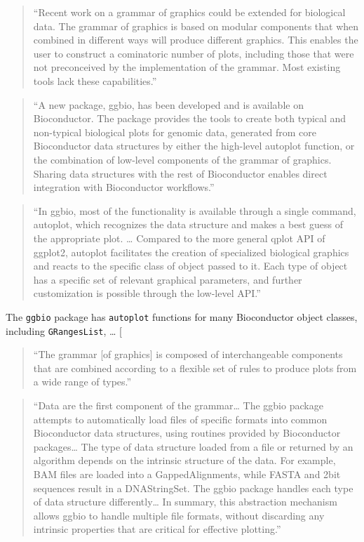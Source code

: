 \documentclass[]{tufte-book}
\begin{document}
\begin{quote}
``Recent work on a grammar of graphics could be extended for biological
data. The grammar of graphics is based on modular components that when
combined in different ways will produce different graphics. This enables
the user to construct a cominatoric number of plots, including those that
were not preconceived by the implementation of the grammar. Most existing
tools lack these capabilities.'' \citep{yin2012ggbio}
\end{quote}

\begin{quote}
``A new package, ggbio, has been developed and is available on Bioconductor.
The package provides the tools to create both typical and non-typical
biological plots for genomic data, generated from core Bioconductor data
structures by either the high-level autoplot function, or the
combination of low-level components of the grammar of graphics. Sharing
data structures with the rest of Bioconductor enables direct integration
with Bioconductor workflows.'' \citep{yin2012ggbio}
\end{quote}

\begin{quote}
``In ggbio, most of the functionality is available through a single
command, autoplot, which recognizes the data structure and makes a best
guess of the appropriate plot. \ldots{} Compared to the more general qplot
API of ggplot2, autoplot facilitates the creation of specialized biological
graphics and reacts to the specific class of object passed to it. Each type
of object has a specific set of relevant graphical parameters, and further
customization is possible through the low-level API.'' \citep{yin2012ggbio}
\end{quote}

The \texttt{ggbio} package has \texttt{autoplot} functions for many Bioconductor object
classes, including \texttt{GRangesList}, \ldots{} {[}\citet{yin2012ggbio}

\begin{quote}
``The grammar {[}of graphics{]} is composed of interchangeable components
that are combined according to a flexible set of rules to produce plots
from a wide range of types.'' \citep{yin2012ggbio}
\end{quote}

\begin{quote}
``Data are the first component of the grammar\ldots{} The ggbio package attempts
to automatically load files of specific formats into common Bioconductor
data structures, using routines provided by Bioconductor packages\ldots{}
The type of data structure loaded from a file or returned by an algorithm
depends on the intrinsic structure of the data. For example, BAM files are
loaded into a GappedAlignments, while FASTA and 2bit sequences result in
a DNAStringSet. The ggbio package handles each type of data structure
differently\ldots{} In summary, this abstraction mechanism allows ggbio to
handle multiple file formats, without discarding any intrinsic properties
that are critical for effective plotting.'' \citep{yin2012ggbio}
\end{quote}
\end{document}
